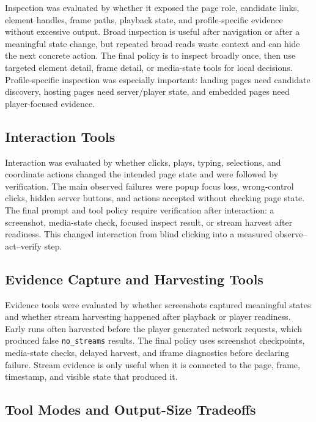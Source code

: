 Inspection was evaluated by whether it exposed the page role, candidate links,
element handles, frame paths, playback state, and profile-specific evidence
without excessive output. Broad inspection is useful after navigation or after
a meaningful state change, but repeated broad reads waste context and can hide
the next concrete action. The final policy is to inspect broadly once, then use
targeted element detail, frame detail, or media-state tools for local decisions.
Profile-specific inspection was especially important: landing pages need
candidate discovery, hosting pages need server/player state, and embedded pages
need player-focused evidence.

\subsection{Interaction Tools}

Interaction was evaluated by whether clicks, plays, typing, selections, and
coordinate actions changed the intended page state and were followed by
verification. The main observed failures were popup focus loss, wrong-control
clicks, hidden server buttons, and actions accepted without checking page
state. The final prompt and tool policy require verification after interaction:
a screenshot, media-state check, focused inspect result, or stream harvest
after readiness. This changed interaction from blind clicking into a measured
observe--act--verify step.

\subsection{Evidence Capture and Harvesting Tools}

Evidence tools were evaluated by whether screenshots captured meaningful
states and whether stream harvesting happened after playback or player
readiness. Early runs often harvested before the player generated network
requests, which produced false \texttt{no\_streams} results. The final policy
uses screenshot checkpoints, media-state checks, delayed harvest, and iframe
diagnostics before declaring failure. Stream evidence is only useful when it is
connected to the page, frame, timestamp, and visible state that produced it.

\subsection{Tool Modes and Output-Size Tradeoffs}

